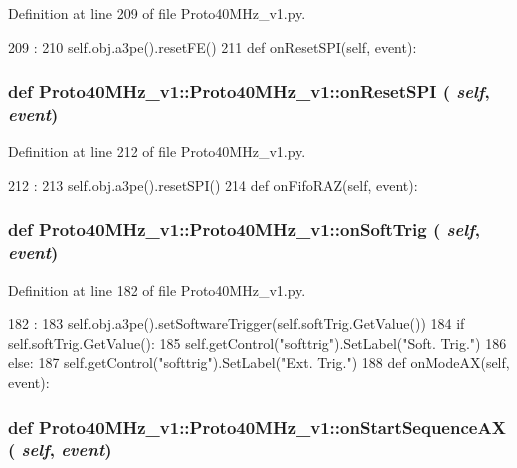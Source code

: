 Definition at line 209 of file Proto40MHz\_\-v1.py.


\begin{DoxyCode}
209                               :
210         self.obj.a3pe().resetFE()
211 
    def onResetSPI(self, event):
\end{DoxyCode}
\hypertarget{classProto40MHz__v1_1_1Proto40MHz__v1_a0ba7c9e73edea993d2591c8f387a62d7}{
\subsubsection[{onResetSPI}]{\setlength{\rightskip}{0pt plus 5cm}def Proto40MHz\_\-v1::Proto40MHz\_\-v1::onResetSPI ( {\em self}, \/   {\em event})}}
\label{classProto40MHz__v1_1_1Proto40MHz__v1_a0ba7c9e73edea993d2591c8f387a62d7}


Definition at line 212 of file Proto40MHz\_\-v1.py.


\begin{DoxyCode}
212                                :
213         self.obj.a3pe().resetSPI()
214 
    def onFifoRAZ(self, event):
\end{DoxyCode}
\hypertarget{classProto40MHz__v1_1_1Proto40MHz__v1_a41e05abb2dd6785a43b62104da43ed40}{
\subsubsection[{onSoftTrig}]{\setlength{\rightskip}{0pt plus 5cm}def Proto40MHz\_\-v1::Proto40MHz\_\-v1::onSoftTrig ( {\em self}, \/   {\em event})}}
\label{classProto40MHz__v1_1_1Proto40MHz__v1_a41e05abb2dd6785a43b62104da43ed40}


Definition at line 182 of file Proto40MHz\_\-v1.py.


\begin{DoxyCode}
182                                :
183         self.obj.a3pe().setSoftwareTrigger(self.softTrig.GetValue())
184         if self.softTrig.GetValue():
185             self.getControl("softtrig").SetLabel("Soft. Trig.")
186         else:
187             self.getControl("softtrig").SetLabel("Ext. Trig.")
188             
    def onModeAX(self, event):
\end{DoxyCode}
\hypertarget{classProto40MHz__v1_1_1Proto40MHz__v1_a9d53068e69e9271c655dbe64e301ab4d}{
\subsubsection[{onStartSequenceAX}]{\setlength{\rightskip}{0pt plus 5cm}def Proto40MHz\_\-v1::Proto40MHz\_\-v1::onStartSequenceAX ( {\em self}, \/   {\em event})}}
\label{classProto40MHz__v1_1_1Proto40MHz__v1_a9d53068e69e9271c655dbe64e301ab4d}


